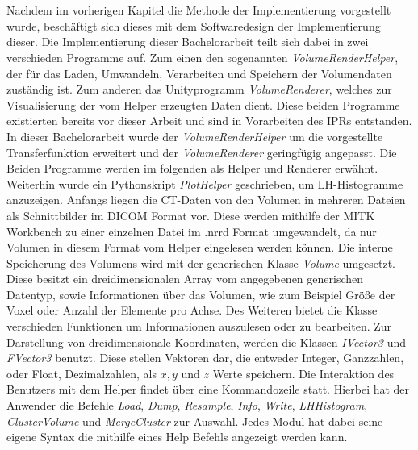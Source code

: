 \chapter{}
\label{sec:concept}


Nachdem im vorherigen Kapitel die Methode der Implementierung vorgestellt wurde, beschäftigt sich dieses mit dem Softwaredesign der Implementierung dieser.
\newline
Die Implementierung dieser Bachelorarbeit teilt sich dabei in zwei verschieden Programme auf. Zum einen den sogenannten \textit{VolumeRenderHelper}, der für das Laden, Umwandeln, Verarbeiten und Speichern der Volumendaten zuständig ist. Zum anderen das Unityprogramm \textit{VolumeRenderer}, welches zur Visualisierung der vom Helper erzeugten Daten dient. Diese beiden Programme existierten bereits vor dieser Arbeit und sind in Vorarbeiten des IPRs entstanden. In dieser Bachelorarbeit wurde der \textit{VolumeRenderHelper} um die vorgestellte Transferfunktion erweitert und der \textit{VolumeRenderer} geringfügig angepasst. Die Beiden Programme werden im folgenden als Helper und Renderer erwähnt. Weiterhin wurde ein Pythonskript \textit{PlotHelper} geschrieben, um LH-Histogramme anzuzeigen.
\newline
{}
Anfangs liegen die CT-Daten von den Volumen in mehreren Dateien als Schnittbilder im DICOM Format vor. Diese werden mithilfe der MITK Workbench zu einer einzelnen Datei im .nrrd Format umgewandelt, da nur Volumen in diesem Format vom Helper eingelesen werden können.
\newline
Die interne Speicherung des Volumens wird mit der generischen Klasse \textit{Volume} umgesetzt. Diese besitzt ein dreidimensionalen Array vom angegebenen generischen Datentyp, sowie Informationen über das Volumen, wie zum Beispiel Größe der Voxel oder Anzahl der Elemente pro Achse. Des Weiteren bietet die Klasse verschieden Funktionen um Informationen auszulesen oder zu bearbeiten. Zur Darstellung von dreidimensionale Koordinaten, werden die Klassen \textit{IVector3} und \textit{FVector3} benutzt. Diese stellen Vektoren dar, die entweder Integer, Ganzzahlen, oder Float, Dezimalzahlen, als $x,y$ und $z$ Werte speichern.
\newline
Die Interaktion des Benutzers mit dem Helper findet über eine Kommandozeile statt. Hierbei hat der Anwender die Befehle \textit{Load}, \textit{Dump}, \textit{Resample}, \textit{Info}, \textit{Write}, \textit{LHHistogram}, \textit{ClusterVolume} und \textit{MergeCluster} zur Auswahl. Jedes Modul hat dabei seine eigene Syntax die mithilfe eines Help Befehls angezeigt werden kann.
